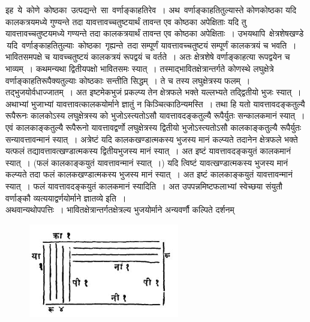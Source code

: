 \documentclass[11pt, openany]{book}
\begin{document}
 इह \,ये \,कोणे \,कोष्ठका \,उत्पद्यन्ते \,सा \,वर्णाङ्काहतिरेव~। अथ \,वर्णाङ्काहतितुल्यास्ते
कोणकोष्ठका यदि कालकत्रयमध्ये गुण्यन्ते तदा यावत्तावच्चतुष्टयार्थं
तावन्त एव कोष्ठका
अपेक्षिताः यदि तु यावत्तावच्चतुष्टयमध्ये गण्यन्ते तदा कालकत्रयार्थं
तावन्त एव कोष्ठका
अपेक्षिताः~। उभयथापि \,क्षेत्रशेषखण्डे \,यदि \,वर्णाङ्काहतितुल्याः \,कोष्ठका \,गृह्यन्ते \,तदा सम्पूर्णं यावत्तावच्चतुष्टयं सम्पूर्णं कालकत्रयं च भवति~। भावितसमपक्षे च
यावच्चतुष्टयं कालकत्रयं रूपद्वयं च वर्तते~। अतः क्षेत्रशेषे
वर्णाङ्काहत्या
रूपद्वयेन च भाव्यम्~। कथमन्यथा द्वितीयपक्षो भावितसमः स्यात्~।
तस्माद्भावितक्षेत्रान्तर्गते कोणस्थे लघुक्षेत्रे वर्णाङ्काहतिरूपैक्यतुल्याः
कोष्ठकाः सन्तीति सिद्धम्~।
ते च तस्य लघुक्षेत्रस्य फलम्~। तद्भुजयोर्वधाज्जातम्~। अत इष्टमेकभुजं
प्रकल्प्य
तेन क्षेत्रफले भक्ते यल्लभ्यते तद्द्वितीयो भुजः स्यात्~। अथाभ्यां
भुजाभ्यां
यावत्तावत्कालकयोर्माने ज्ञातुं न किञ्चित्काठिन्यमस्ति~। तथा हि यतो
यावत्तावदङ्कतुल्यै रूपैरूनः कालकोऽस्य लघुक्षेत्रस्य को भुजोऽस्त्यतोऽसौ
यावत्तावदङ्कतुल्यै रूपैर्युतः
सन्कालकमानं स्यात्~। एवं कालकाङ्कतुल्यै रूपैरूनो यावत्तावद्वर्णो लघुक्षेत्रस्य
द्वितीयो भुजोऽस्त्यतोऽसौ कालकाङ्कतुल्यै रूपैर्युतः सन्यावत्तावन्मानं
स्यात्~। अत्रेष्टं
यदि कालकखण्डात्मकस्य भुजस्य मानं कल्प्यते तदानेन क्षेत्रफले भक्ते
यत्फलं
तद्यावत्तावत्खण्डात्मकस्य द्वितीयभुजस्य मानं स्यात्~। अत इष्टं
यावत्तावदङ्कयुतं
कालकमानं स्यात्~। (फलं कालकाङ्कयुतं यावत्तावन्मानं स्यात्~।) यदि त्विष्टं
\newpage
\noindent यावत्खण्डात्मकस्य भुजस्य मानं कल्प्यते तदा फलं कालकखण्डात्मकस्य भुजस्य
 मानं स्यात्~। अत इष्टं कालकाङ्कयुतं यावत्तावन्मानं स्यात्~। फलं
यावत्तावदङ्कयुतं कालकमानं स्यादिति~। अत उपपन्नमिष्टफलाभ्यां स्वेच्छया संयुतौ 
वर्णाङ्कौ व्यत्ययाद्वर्णयोर्माने ज्ञातव्ये इति~। \\

\vspace{-4mm}
 अथवान्यथोपपत्तिः~। भावितक्षेत्रान्तर्गतक्षेत्रल्य भुजयोर्माने अन्यवर्णौ
कल्पिते दर्शनम्
\vspace{-4mm}

\begin{figure}[h!]
    \centering
    \includegraphics[scale=.7]{graphics/Capture22.png}
\end{figure}
\vspace{-2mm}
\end{document}
